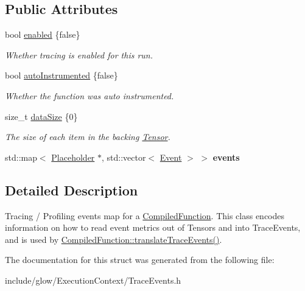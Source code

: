 \subsection*{Public Attributes}
\begin{DoxyCompactItemize}
\item 
\mbox{\label{structglow_1_1_trace_info_a3cd948ec521070622707582feabedfba}} 
bool \hyperlink{structglow_1_1_trace_info_a3cd948ec521070622707582feabedfba}{enabled} \{false\}
\begin{DoxyCompactList}\small\item\em Whether tracing is enabled for this run. \end{DoxyCompactList}\item 
\mbox{\label{structglow_1_1_trace_info_aef86bfa27c54e11743025965a4306173}} 
bool \hyperlink{structglow_1_1_trace_info_aef86bfa27c54e11743025965a4306173}{auto\+Instrumented} \{false\}
\begin{DoxyCompactList}\small\item\em Whether the function was auto instrumented. \end{DoxyCompactList}\item 
\mbox{\label{structglow_1_1_trace_info_a3a688877f66fe1ac1ec5c43854a6ecb8}} 
size\+\_\+t \hyperlink{structglow_1_1_trace_info_a3a688877f66fe1ac1ec5c43854a6ecb8}{data\+Size} \{0\}
\begin{DoxyCompactList}\small\item\em The size of each item in the backing \hyperlink{classglow_1_1_tensor}{Tensor}. \end{DoxyCompactList}\item 
\mbox{\label{structglow_1_1_trace_info_a2d2e7d62ba5d37fe6d4bb1312cbce64b}} 
std\+::map$<$ \hyperlink{classglow_1_1_placeholder}{Placeholder} $\ast$, std\+::vector$<$ \hyperlink{structglow_1_1_trace_info_1_1_event}{Event} $>$ $>$ {\bfseries events}
\end{DoxyCompactItemize}


\subsection{Detailed Description}
Tracing / Profiling events map for a \hyperlink{classglow_1_1_compiled_function}{Compiled\+Function}. This class encodes information on how to read event metrics out of Tensors and into Trace\+Events, and is used by \hyperlink{classglow_1_1_compiled_function_ab2c21d3d37661c8f7bc0629c19b1fa27}{Compiled\+Function\+::translate\+Trace\+Events()}. 

The documentation for this struct was generated from the following file\+:\begin{DoxyCompactItemize}
\item 
include/glow/\+Execution\+Context/Trace\+Events.\+h\end{DoxyCompactItemize}
